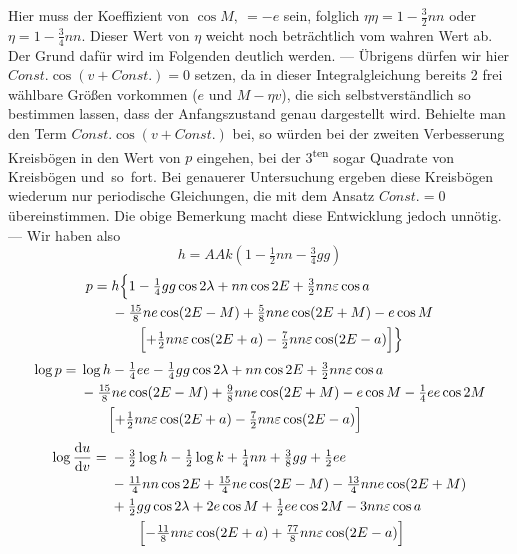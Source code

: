 \clearpage
\begingroup
{}
\renewcommand{\headrulewidth}{0pt}
\noindent Hier muss der Koeffizient von \(\cos M,\ =-e\) sein,
folglich \(\eta\eta=1-\tfrac32nn\) oder \(\eta=1-\tfrac34nn\).
Dieser Wert von \(\eta\) weicht noch beträchtlich
vom wahren Wert ab. Der Grund dafür wird im Folgenden deutlich werden. --- Übrigens
dürfen wir hier \(\mathit{Const.}\cos(v+\mathit{Const.})=0\) setzen,
da in dieser Integralgleichung bereits 2 frei wählbare Größen vorkommen
(\(e\) und \(M-\eta v\)), die sich selbstverständlich so bestimmen lassen,
dass der Anfangszustand genau dargestellt wird. Behielte man den Term
\(\mathit{Const.}\cos(v+\mathit{Const.})\) bei, so würden bei der zweiten
Verbesserung Kreisbögen in den Wert von \(p\) eingehen, bei der
3\textsuperscript{ten} sogar Quadrate von Kreisbögen und~so~fort. Bei
genauerer Untersuchung ergeben diese Kreisbögen wiederum nur periodische
Gleichungen, die mit dem Ansatz \(\mathit{Const.}=0\) übereinstimmen.
Die obige Bemerkung macht diese Entwicklung jedoch unnötig. ---
Wir haben also
\[
 h=AAk(1-\tfrac12nn-\tfrac34gg)
\]
\[
\begin{aligned}
 p={}&h\Bigl\{1-\tfrac14gg\cos2\lambda+nn\cos2E+\tfrac32nn\varepsilon\cos a\\
 &-\tfrac{15}{8}ne\cos(2E-M)+\tfrac58nne\cos(2E+M)-e\cos M\\
 &\qquad\Bigl[+\tfrac12nn\varepsilon\cos(2E+a)
                  -\tfrac72nn\varepsilon\cos(2E-a)\Bigr]\Bigr\}
\end{aligned}
\]
\[
\begin{aligned}
 \log p={}&\log h-\tfrac14ee-\tfrac14gg\cos2\lambda+nn\cos2E
                  +\tfrac32nn\varepsilon\cos a\\
 &-\tfrac{15}{8}ne\cos(2E-M)+\tfrac98nne\cos(2E+M)
                  -e\cos M-\tfrac14ee\cos2M\\
 &\qquad\Bigl[+\tfrac12nn\varepsilon\cos(2E+a)
                  -\tfrac72nn\varepsilon\cos(2E-a)\Bigr]
\end{aligned}
\]
\[
\begin{aligned}
 \log\frac{\mathrm{d}u}{\mathrm{d}v}
   ={}&-\tfrac32\log h-\tfrac12\log k+\tfrac14nn+\tfrac38gg+\tfrac12ee\\
 &-\tfrac{11}{4}nn\cos2E+\tfrac{15}{4}ne\cos(2E-M)
                   -\tfrac{13}{4}nne\cos(2E+M)\\
 &+\tfrac12gg\cos2\lambda+2e\cos M+\tfrac12ee\cos2M-3nn\varepsilon\cos a\\
 &\qquad\Bigl[-\tfrac{11}{8}nn\varepsilon\cos(2E+a)
                   +\tfrac{77}{8}nn\varepsilon\cos(2E-a)\Bigr]
\end{aligned}
\]
